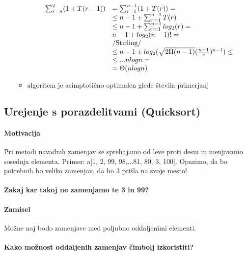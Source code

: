 \documentclass[a4paper,10pt]{article}
\begin{document}
\begin{itemize}
\begin{itemize}
$$\begin{array}{rl}
	\sum_{r=n}^2 (1 + T(r-1)) & = \sum_{r=1}^{n-1} (1 + T(r)) = \\
	& \leq n - 1 + \sum_{r=1}^{n-1} T(r) \\
	& \leq n - 1 + \sum_{r=1}^{n-1} log_2(r) = \\
	& n - 1 + log_2(n-1)! = \\
	& \left / \mbox{Stirling} \right / \\
	& \leq n - 1 + log_2(\sqrt{2 \Pi (n-1)} (\frac{n-1}{e})^{n-1}) \leq \\
	& \leq ... nlogn = \\
	& = \Theta (n log n)
	\end{array}
	$$
	\item algoritem je asimptoti\v cno optimalen glede \v stevila primerjanj
	\end{itemize}
\end{itemize}

\subsection{Urejenje s porazdelitvami (Quicksort)}

\paragraph{Motivacija}
Pri metodi navadnih zamenjav se sprehajamo od leve proti desni in menjavamo sosednja elementa. Primer: a[1, 2, 99, 98,...81, 80, 3, 100]. Opazimo, da bo potrebnih bo veliko zamenjav, da bo 3 pri\v sla na svoje mesto!\\
\\
\textbf{Zakaj kar takoj ne zamenjamo te 3 in 99?}

\paragraph{Zamisel}
Mo\v zne naj bodo zamenjave med poljubno oddaljenimi elementi.\\
\\
\textbf{Kako mo\v znost oddaljenih zamenjav \v cimbolj izkoristiti?}
\end{document}
